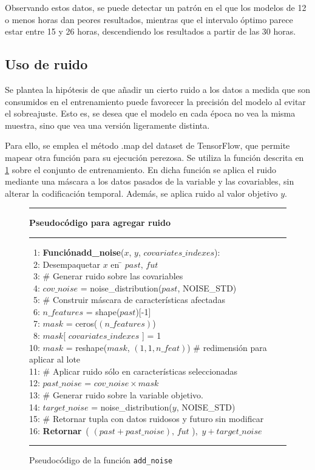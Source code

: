 Observando estos datos, se puede detectar un patrón en el que los modelos de 12 o menos horas dan peores resultados, 
mientras que el intervalo óptimo parece estar entre 15 y 26 horas, descendiendo los resultados a partir de las 30 horas.


\subsection{Uso de ruido}
Se plantea la hipótesis de que añadir un cierto ruido a los datos a medida que son consumidos en el entrenamiento puede favorecer la precisión del modelo al evitar el sobreajuste.
Esto es, se desea que el modelo en cada época no vea la misma muestra, sino que vea una versión ligeramente distinta. 

Para ello, se emplea el método .map del dataset de TensorFlow, que permite mapear otra función para su ejecución perezosa.
Se utiliza la función descrita en \ref{add_noise} sobre el conjunto de entrenamiento. En dicha función se aplica el ruido mediante una máscara
a los datos pasados de la variable y las covariables, sin alterar la codificación temporal. Además, se aplica ruido al valor objetivo $y$.

\begin{figure}[H]
{\small
\hrule
{\bf\small Pseudocódigo para agregar ruido}
\hrule
\begin{center}
\begin{tabbing}
\ 1: {\bf Función}\={\bf add\_noise}($x$, $y$, $covariates\_indexes$): \\
\ 2: \> Desempaquetar $x$ en \= $past,\, fut$ \\
\ 3: \> \# Generar ruido sobre las covariables \\
\ 4: \> $cov\_noise$ = noise\_distribution($past$, NOISE\_STD) \\
\ 5: \> \# Construir máscara de características afectadas \\
\ 6: \> $n\_features$ = shape($past$)[-1] \\
\ 7: \> $mask$ = ceros($(n\_features)$) \\
\ 8: \> $mask$[ $covariates\_indexes$ ] = 1 \\
10: \> $mask$ = reshape($mask$, $(1,1,n\_feat)$)  \# redimensión para aplicar al lote \\
11: \> \# Aplicar ruido sólo en características seleccionadas \\
12: \> $past\_noise$ = $cov\_noise \times mask$ \\
13: \> \# Generar ruido sobre la variable objetivo. \\
14: \> $target\_noise$ = noise\_distribution($y$, NOISE\_STD) \\
15: \> \# Retornar tupla con datos ruidosos y futuro sin modificar \\
16: \> {\bf Retornar}\ ( $(past + past\_noise),\, fut$ ),\ $y + target\_noise$ \\
\end{tabbing}
\end{center}
}
\hrule
\caption{Pseudocódigo de la función \texttt{add\_noise}}
\label{add_noise}
\end{figure}


